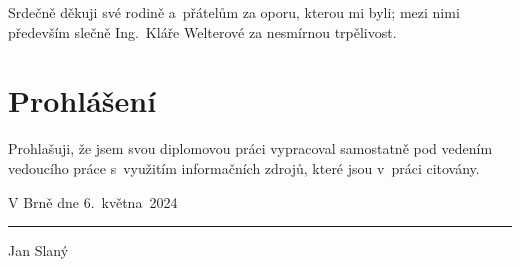 Srdečně děkuji své rodině a~přátelům za oporu, kterou mi byli;
mezi nimi především slečně Ing.~Kláře Welterové za nesmírnou trpělivost.
\vfill

{\let\clearpage\relax\chapter*{Prohlášení}}
\thispagestyle{empty}
Prohlašuji, že jsem svou diplomovou práci vypracoval samostatně
pod vedením vedoucího práce s~využitím informačních zdrojů,
které jsou v~práci citovány.
\bigskip

\noindent
V Brně dne 6.~května~2024
\hfill
\parbox{6cm}{
	\centering
	\vspace{1.5cm}
	\rule{6cm}{0.1pt}\par
	Jan Slaný
}
